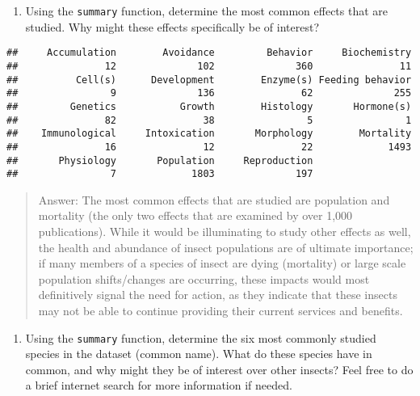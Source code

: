 \documentclass[]{article}
\newenvironment{Shaded}{\begin{snugshade}}{\end{snugshade}}
\newcommand{\CommentTok}[1]{\textcolor[rgb]{0.56,0.35,0.01}{\textit{#1}}}
\newcommand{\KeywordTok}[1]{\textcolor[rgb]{0.13,0.29,0.53}{\textbf{#1}}}
\newcommand{\NormalTok}[1]{#1}
\newcommand{\OperatorTok}[1]{\textcolor[rgb]{0.81,0.36,0.00}{\textbf{#1}}}
\providecommand{\tightlist}{%
  \setlength{\itemsep}{0pt}\setlength{\parskip}{0pt}}
\begin{document}
\begin{enumerate}
\def\labelenumi{\arabic{enumi}.}
\setcounter{enumi}{5}
\tightlist
\item
  Using the \texttt{summary} function, determine the most common effects
  that are studied. Why might these effects specifically be of interest?
\end{enumerate}

\begin{Shaded}
\end{Shaded}

\begin{verbatim}
##     Accumulation        Avoidance         Behavior     Biochemistry 
##               12              102              360               11 
##          Cell(s)      Development        Enzyme(s) Feeding behavior 
##                9              136               62              255 
##         Genetics           Growth        Histology       Hormone(s) 
##               82               38                5                1 
##    Immunological     Intoxication       Morphology        Mortality 
##               16               12               22             1493 
##       Physiology       Population     Reproduction 
##                7             1803              197
\end{verbatim}

\begin{quote}
Answer: The most common effects that are studied are population and
mortality (the only two effects that are examined by over 1,000
publications). While it would be illuminating to study other effects as
well, the health and abundance of insect populations are of ultimate
importance; if many members of a species of insect are dying (mortality)
or large scale population shifts/changes are occurring, these impacts
would most definitively signal the need for action, as they indicate
that these insects may not be able to continue providing their current
services and benefits.
\end{quote}

\begin{enumerate}
\def\labelenumi{\arabic{enumi}.}
\setcounter{enumi}{6}
\tightlist
\item
  Using the \texttt{summary} function, determine the six most commonly
  studied species in the dataset (common name). What do these species
  have in common, and why might they be of interest over other insects?
  Feel free to do a brief internet search for more information if
  needed.
\end{enumerate}
\end{document}
